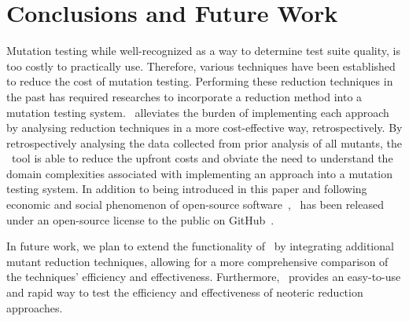 \section{Conclusions and Future Work}

Mutation testing while well-recognized as a way to determine test suite quality, is too costly
to practically use. Therefore, various techniques have been established to reduce the cost
of mutation testing. Performing these reduction techniques in the past has required researches
to incorporate a reduction method into a mutation testing system. \mr~alleviates the burden of implementing
each approach by analysing reduction techniques in a more cost-effective way, retrospectively.
By retrospectively analysing the data collected from prior analysis of all mutants, the \mr~tool is able to reduce
the upfront costs and obviate the need to understand the domain complexities associated with implementing an approach
into a mutation testing system. In addition to being introduced in this paper and following economic
and social phenomenon of open-source software~\cite{hippel2003open}, \mr~has been released under
an open-source license to the public on GitHub~\cite{github}.

In future work, we plan to extend the functionality of \mr~by integrating additional
mutant reduction techniques, allowing for a more comprehensive comparison of the techniques'
efficiency and effectiveness. Furthermore, \mr~provides an easy-to-use and rapid
way to test the efficiency and effectiveness of neoteric reduction approaches.

